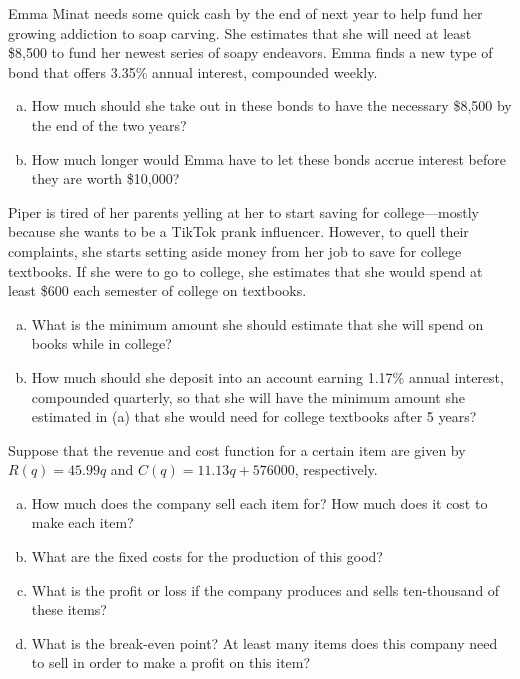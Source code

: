 \documentclass[11pt,letterpaper]{article}
\begin{document}
\prob Emma Minat needs some quick cash by the end of next year to help fund her growing addiction to soap carving. She estimates that she will need at least \$8,500 to fund her newest series of soapy endeavors. Emma finds a new type of bond that offers 3.35\% annual interest, compounded weekly. 
	\begin{enumerate}[(a)]
	\item How much should she take out in these bonds to have the necessary \$8,500 by the end of the two years?
	\item How much longer would Emma have to let these bonds accrue interest before they are worth \$10,000?
	\end{enumerate} \pspace  


\prob Piper is tired of her parents yelling at her to start saving for college---mostly because she wants to be a TikTok prank influencer. However, to quell their complaints, she starts setting aside money from her job to save for college textbooks. If she were to go to college, she estimates that she would spend at least \$600 each semester of college on textbooks. 
	\begin{enumerate}[(a)]
	\item What is the minimum amount she should estimate that she will spend on books while in college? 
	\item How much should she deposit into an account earning 1.17\% annual interest, compounded quarterly, so that she will have the minimum amount she estimated in (a) that she would need for college textbooks after 5 years? 
	\end{enumerate} \pspace  
  
  
\prob Suppose that the revenue and cost function for a certain item are given by $R(q)= 45.99q$ and $C(q)= 11.13q + 576000$, respectively. 
	\begin{enumerate}[(a)]
	\item How much does the company sell each item for? How much does it cost to make each item?
	\item What are the fixed costs for the production of this good?
	\item What is the profit or loss if the company produces and sells ten-thousand of these items?
	\item What is the break-even point? At least many items does this company need to sell in order to make a profit on this item?
	\end{enumerate} \pspace
\end{document}
